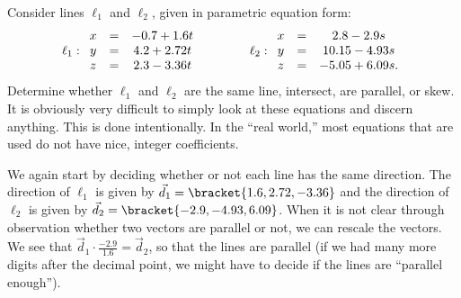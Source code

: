 \begin{example}\label{ex_lines3}%
Consider lines $\ell_1$ and $\ell_2$, given in parametric equation form:
\[
\ell_1: \begin{array}{ c c c } x&=&-0.7+1.6t \\ y&=&4.2+2.72t\\z&=&2.3-3.36t\end{array}
\qquad\qquad
\ell_2:\begin{array}{ c c c } x&=&2.8-2.9s\\y&=&10.15-4.93s\\z&=&-5.05+6.09s.\end{array}
\]
Determine whether $\ell_1$ and $\ell_2$ are the same line, intersect, are parallel, or skew.
\solution
It is obviously very difficult to simply look at these equations and discern anything. This is done intentionally. In the ``real world,'' most equations that are used do not have nice, integer coefficients.%

We again start by deciding whether or not each line has the same direction. The direction of $\ell_1$ is given by $\vec d_1 =\bracket{1.6,2.72,-3.36}$ and the direction of $\ell_2$ is given by $\vec d_2 =\bracket{-2.9,-4.93,6.09}$. When it is not clear through observation whether two vectors are parallel or not,
%
we can rescale the vectors.  We see that $\vec d_1\cdot\frac{-2.9}{1.6}=\vec d_2$, so that the lines are parallel (if we had many more digits after the decimal point, we might have to decide if the lines are ``parallel enough'').


\end{example}
